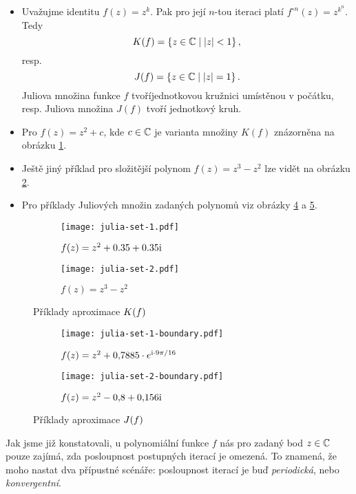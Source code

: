 \begin{example}
    \begin{itemize}
        \item Uvažujme identitu $f(z)=z^k$. Pak pro její $n$-tou iteraci platí $f^{\circ n}(z)=z^{k^n}$. Tedy
        \[K(f)=\left\{z\in\mathbb{C}\mid |z|<1\right\},\]
        resp.
        \[J(f)=\left\{z\in\mathbb{C}\mid|z|=1\right\}.\]
        Juliova množina funkce $f$ tvoříjednotkovou kružnici umístěnou v počátku, resp. Juliova množina $J(f)$ tvoří jednotkový kruh.
        \item Pro $f(z)=z^2+c$, kde $c\in\mathbb{C}$ je varianta množiny $K(f)$ znázorněna na obrázku \ref{subfig:vyplnena-juliova-mnozina-1}.
        \item Ještě jiný příklad pro složitější polynom $f(z)=z^3-z^2$ lze vidět na obrázku \ref{subfig:vyplnena-juliova-mnozina-2}.
        \item Pro příklady Juliových množin zadaných polynomů viz obrázky \ref{subfig:juliova-mnozina-1} a \ref{subfig:juliova-mnozina-2}.
    \end{itemize}
\end{example}
\begin{figure}[h]
    \centering
    \begin{subfigure}{0.45\textwidth}
        \centering
        \texttt{[image: julia-set-1.pdf]}
        \caption{$f(z)=z^2+0.35 + 0.35\textrm{i}$}
        \label{subfig:vyplnena-juliova-mnozina-1}
    \end{subfigure}
    \qquad
    \begin{subfigure}{0.45\textwidth}
        \centering
        \texttt{[image: julia-set-2.pdf]}
        \caption{$f(z)=z^3-z^2$}
        \label{subfig:vyplnena-juliova-mnozina-2}
    \end{subfigure}
    \caption{Příklady aproximace $K(f)$}
    \label{fig:priklady-vyplnenych-juliovych-mnozin}
\end{figure}
\begin{figure}[h]
    \centering
    \begin{subfigure}{0.45\textwidth}
        \centering
        \texttt{[image: julia-set-1-boundary.pdf]}
        \caption{$f(z)=z^2 + 0{,}7885\cdot e^{\textrm{i}\cdot9\pi/16}$}
        \label{subfig:juliova-mnozina-1}
    \end{subfigure}
    \qquad
    \begin{subfigure}{0.45\textwidth}
        \centering
        \texttt{[image: julia-set-2-boundary.pdf]}
        \caption{$f(z)=z^2 - 0{,}8 + 0{,}156\textrm{i}$}
        \label{subfig:juliova-mnozina-2}
    \end{subfigure}
    \caption{Příklady aproximace $J(f)$}
    \label{fig:priklady-juliovych-mnozin}
\end{figure}
Jak jsme již konstatovali, u polynomiální funkce $f$ nás pro zadaný bod $z\in\mathbb{C}$ pouze zajímá, zda posloupnost postupných iterací je omezená. To znamená, že moho nastat dva přípustné scénáře: posloupnost iterací je buď \emph{periodická}, nebo \emph{konvergentní}.

